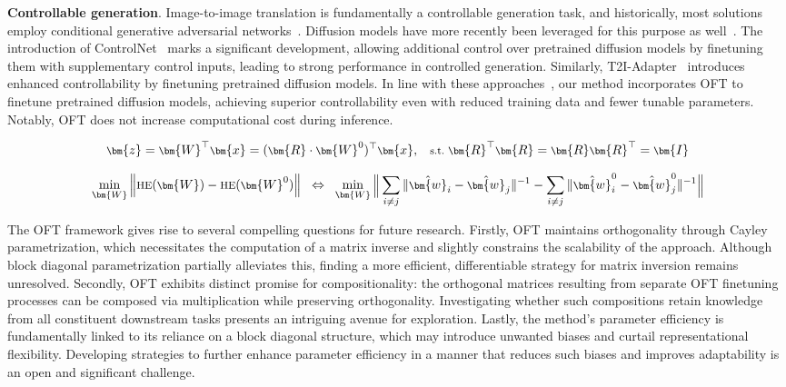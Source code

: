 \begin{itemize}[leftmargin=*,nosep]
\begin{itemize}[leftmargin=*,nosep]
\textbf{Controllable generation}. Image-to-image translation is fundamentally a controllable generation task, and historically, most solutions employ conditional generative adversarial networks~\cite{isola2017image,zhu2017toward,wang2018high,park2019semantic,choi2018stargan}. Diffusion models have more recently been leveraged for this purpose as well~\cite{saharia2022palette,voynov2022sketch,wang2022pretraining}. The introduction of ControlNet~\cite{zhang2023adding} marks a significant development, allowing additional control over pretrained diffusion models by finetuning them with supplementary control inputs, leading to strong performance in controlled generation. Similarly, T2I-Adapter~\cite{mou2023t2i} introduces enhanced controllability by finetuning pretrained diffusion models. In line with these approaches~\cite{zhang2023adding,mou2023t2i}, our method incorporates OFT to finetune pretrained diffusion models, achieving superior controllability even with reduced training data and fewer tunable parameters. Notably, OFT does not increase computational cost during inference.

\begin{equation}\label{eq:oft_general}
    \footnotesize
    \bm{z} = \bm{W}^\top \bm{x} = (\bm{R} \cdot \bm{W}^0)^\top \bm{x},~~~\text{s.t.}~\bm{R}^\top \bm{R} = \bm{R} \bm{R}^\top = \bm{I}
\end{equation}

\begin{equation}\label{eq:oft_principle}
\footnotesize
\min_{\bm{W}} \left\| \text{HE}(\bm{W})-\text{HE}(\bm{W}^0)\right\|~~\Leftrightarrow~~\min_{\bm{W}} \bigg{\|} \sum_{i\neq j} \|\hat{\bm{w}}_i-\hat{\bm{w}}_j\|^{-1}-\sum_{i\neq j} \|\hat{\bm{w}}^0_i-\hat{\bm{w}}^0_j\|^{-1}\bigg{\|}
\end{equation}

The OFT framework gives rise to several compelling questions for future research. Firstly, OFT maintains orthogonality through Cayley parametrization, which necessitates the computation of a matrix inverse and slightly constrains the scalability of the approach. Although block diagonal parametrization partially alleviates this, finding a more efficient, differentiable strategy for matrix inversion remains unresolved. Secondly, OFT exhibits distinct promise for compositionality: the orthogonal matrices resulting from separate OFT finetuning processes can be composed via multiplication while preserving orthogonality. Investigating whether such compositions retain knowledge from all constituent downstream tasks presents an intriguing avenue for exploration. Lastly, the method’s parameter efficiency is fundamentally linked to its reliance on a block diagonal structure, which may introduce unwanted biases and curtail representational flexibility. Developing strategies to further enhance parameter efficiency in a manner that reduces such biases and improves adaptability is an open and significant challenge.


\end{itemize}
\end{itemize}
